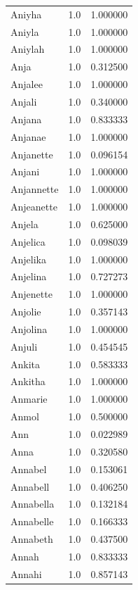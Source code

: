 \documentclass[
  letterpaper,
  DIV=11,
  numbers=noendperiod]{scrreprt}
\begin{document}
\begin{tabular}{lrr}
Aniyha          &   1.0 &   1.000000 \\
Aniyla          &   1.0 &   1.000000 \\
Aniylah         &   1.0 &   1.000000 \\
Anja            &   1.0 &   0.312500 \\
Anjalee         &   1.0 &   1.000000 \\
Anjali          &   1.0 &   0.340000 \\
Anjana          &   1.0 &   0.833333 \\
Anjanae         &   1.0 &   1.000000 \\
Anjanette       &   1.0 &   0.096154 \\
Anjani          &   1.0 &   1.000000 \\
Anjannette      &   1.0 &   1.000000 \\
Anjeanette      &   1.0 &   1.000000 \\
Anjela          &   1.0 &   0.625000 \\
Anjelica        &   1.0 &   0.098039 \\
Anjelika        &   1.0 &   1.000000 \\
Anjelina        &   1.0 &   0.727273 \\
Anjenette       &   1.0 &   1.000000 \\
Anjolie         &   1.0 &   0.357143 \\
Anjolina        &   1.0 &   1.000000 \\
Anjuli          &   1.0 &   0.454545 \\
Ankita          &   1.0 &   0.583333 \\
Ankitha         &   1.0 &   1.000000 \\
Anmarie         &   1.0 &   1.000000 \\
Anmol           &   1.0 &   0.500000 \\
Ann             &   1.0 &   0.022989 \\
Anna            &   1.0 &   0.320580 \\
Annabel         &   1.0 &   0.153061 \\
Annabell        &   1.0 &   0.406250 \\
Annabella       &   1.0 &   0.132184 \\
Annabelle       &   1.0 &   0.166333 \\
Annabeth        &   1.0 &   0.437500 \\
Annah           &   1.0 &   0.833333 \\
Annahi          &   1.0 &   0.857143 \\

\end{tabular}
\end{document}
